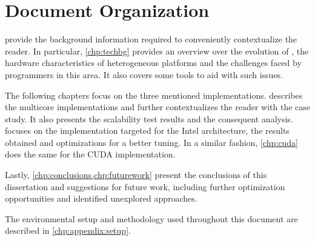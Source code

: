 \documentclass[../thesis]{subfiles}
\begin{document}
	\section{Document Organization}
	 provide the background information required to conveniently contextualize the reader. In particular, \cref{chp:techbg} provides an overview over the evolution of \hpc, the hardware characteristics of heterogeneous platforms and the challenges faced by programmers in this area. It also covers some tools to aid with such issues.

	The following chapters focus on the three mentioned implementations.  describes the multicore implementations and further contextualizes the reader with the case study. It also presents the scalability test results and the consequent analysis.  focuses on the implementation targeted	 for the Intel \mic architecture, the results obtained and optimizations for a better tuning. In a similar fashion, \cref{chp:cuda} does the same for the CUDA implementation.

	Lastly, \cref{chp:conclusions,chp:futurework} present the conclusions of this dissertation and suggestions for future work, including further optimization opportunities and identified unexplored approaches.

	The environmental setup and methodology used throughout this document are described in \cref{chp:appendix:setup}.
\end{document}
